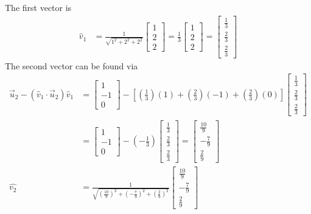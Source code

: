 \begin{solution}
The first vector is
\begin{align*}
\hat{v}_1 &= \frac{1}{\sqrt{1^2+2^2+2^2}}
\begin{bmatrix}
1 \\
2 \\
2
\end{bmatrix} 
= 
\frac{1}{3}
\begin{bmatrix}
1 \\
2 \\
2
\end{bmatrix} 
=
\begin{bmatrix}
\frac{1}{3} \\
\frac{2}{3} \\
\frac{2}{3}
\end{bmatrix}
\end{align*}
The second vector can be found via
\begin{align*}
\vec{u}_2 - (\hat{v}_1 \cdot \vec{u}_2)\hat{v}_1 &= 
\begin{bmatrix}
1 \\
-1 \\
0
\end{bmatrix} 
-
[(\frac{1}{3})(1) + (\frac{2}{3})(-1) + (\frac{2}{3})(0)]
\begin{bmatrix}
\frac{1}{3} \\
\frac{2}{3} \\
\frac{2}{3}
\end{bmatrix} \\
&= 
\begin{bmatrix}
1 \\
-1 \\
0
\end{bmatrix}
- (-\frac{1}{3})
\begin{bmatrix}
\frac{1}{3} \\
\frac{2}{3} \\
\frac{2}{3}
\end{bmatrix}
=
\begin{bmatrix}
\frac{10}{9} \\
-\frac{7}{9} \\
\frac{2}{9}
\end{bmatrix} \\
\hat{v_2} &= \frac{1}{\sqrt{(\frac{10}{9})^2+(-\frac{7}{9})^2+(\frac{2}{9})^2}}
\begin{bmatrix}
\frac{10}{9} \\
-\frac{7}{9} \\
\frac{2}{9}
\end{bmatrix}

\end{align*}
\end{solution}
